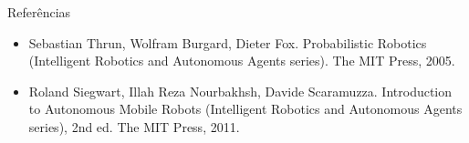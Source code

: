 \documentclass[aspectratio=169]{beamer}
\begin{document}
\begin{frame}[t]{Referências}

    \begin{itemize}
        \item Sebastian Thrun, Wolfram Burgard, Dieter Fox. Probabilistic Robotics (Intelligent Robotics and Autonomous Agents series). The MIT Press, 2005.
        \item Roland Siegwart, Illah Reza Nourbakhsh, Davide Scaramuzza. Introduction to Autonomous Mobile Robots (Intelligent Robotics and Autonomous Agents series), 2nd ed. The MIT Press, 2011.
    \end{itemize}

\end{frame}
\end{document}
